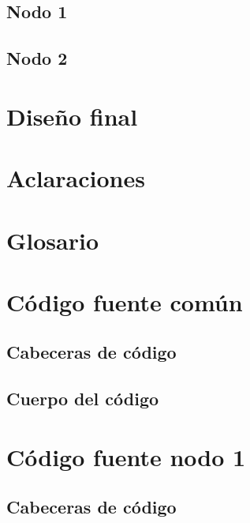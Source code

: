 \documentclass[a4paper,oneside,12pt]{article}
\begin{document}
\subsection{Nodo 1}

\subsection{Nodo 2}


\section{Diseño final}
\section{Aclaraciones}

\section{Glosario}

\appendix
\section{Código fuente común}
\label{anx:common-code}
\subsection{Cabeceras de código}



\subsection{Cuerpo del código}



\section{Código fuente nodo 1}
\subsection{Cabeceras de código}




\end{document}
